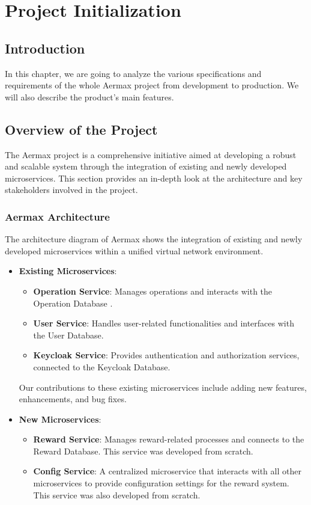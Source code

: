 \chapter{Project Initialization}
\newpage

\setcounter{secnumdepth}{0} %


\section{Introduction}
In this chapter, we are going to analyze the various specifications and requirements of the whole Aermax project from development to production.
We will also describe the product's main features.

\section{Overview of the Project}
The Aermax project is a comprehensive initiative aimed at developing a robust and scalable system through the integration of existing and newly developed microservices. This section provides an in-depth look at the architecture and key stakeholders involved in the project.

\subsection{Aermax Architecture}

The architecture diagram of Aermax shows the integration of existing and newly developed microservices within a unified virtual network environment.
\begin{itemize}
    \item \textbf{Existing Microservices}:
    \begin{itemize}
        \item \textbf{Operation Service}: Manages operations and interacts with the Operation Database .
        \item \textbf{User Service}: Handles user-related functionalities and interfaces with the User Database.
        \item \textbf{Keycloak Service}: Provides authentication and authorization services, connected to the Keycloak Database.
    \end{itemize}
    Our contributions to these existing microservices include adding new features, enhancements, and bug fixes.
    \item \textbf{New Microservices}:
    \begin{itemize}
        \item \textbf{Reward Service}: Manages reward-related processes and connects to the Reward Database. This service was developed from scratch.
        \item \textbf{Config Service}: A centralized microservice that interacts with all other microservices to provide configuration settings for the reward system. This service was also developed from scratch.
    \end{itemize}
\end{itemize}


